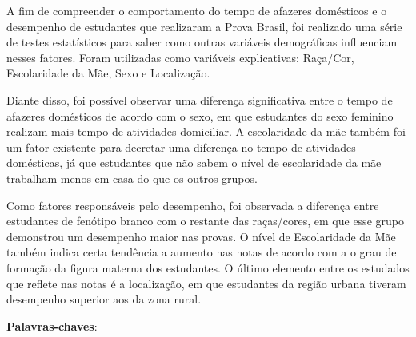 
\setlength{\absparsep}{18pt} %
\begin{resumo}  
    

  A fim de compreender o comportamento do tempo de afazeres domésticos e o desempenho de
  estudantes que realizaram a Prova Brasil, foi realizado uma série de testes estatísticos para saber como 
  outras variáveis demográficas influenciam nesses fatores. Foram utilizadas como variáveis explicativas: Raça/Cor,
  Escolaridade da Mãe, Sexo e Localização.
 
  Diante disso, foi possível observar uma diferença significativa entre o tempo de afazeres domésticos de acordo com o sexo,
  em que estudantes do sexo feminino realizam mais tempo de atividades domiciliar. A escolaridade da mãe também foi um fator existente
  para decretar uma diferença no tempo de atividades domésticas, já que estudantes que não sabem o nível de escolaridade da mãe 
  trabalham menos em casa do que os outros grupos.
 
  Como fatores responsáveis pelo desempenho, foi observada a diferença entre estudantes de fenótipo branco com o restante
  das raças/cores, em que esse grupo demonstrou um desempenho maior nas provas. O nível de Escolaridade da Mãe também indica 
  certa tendência a aumento nas notas de acordo com a o grau de formação da figura materna dos estudantes. O último 
  elemento entre os estudados que reflete nas notas é a localização, em que estudantes da região urbana tiveram desempenho superior 
  aos da zona rural.
    
  \noindent
  \textbf{Palavras-chaves}: \kwords
\end{resumo}
